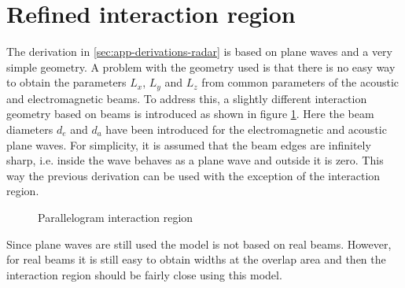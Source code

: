 \documentclass[11pt,twoside]{eitExjobb}
\begin{document}
	\section{Refined interaction region} \label{sec:app-derivations-refined}
	The derivation in \ref{sec:app-derivations-radar} is based on plane waves and a very simple geometry. A problem with the geometry used is that there is no easy way to obtain the parameters $L_x$, $L_y$ and $L_z$ from common parameters of the acoustic and electromagnetic beams. To address this, a slightly different interaction geometry based on beams is introduced as shown in figure \ref{fig:parallelogram}. Here the beam diameters $d_e$ and $d_a$ have been introduced for the electromagnetic and acoustic plane waves. For simplicity, it is assumed that the beam edges are infinitely sharp, i.e. inside the wave behaves as a plane wave and outside it is zero. This way the previous derivation can be used with the exception of the interaction region.
	\begin{figure}[h]
		\centering
		\resizebox{\textwidth}{!}{
			
		}
		\caption{\label{fig:parallelogram} Parallelogram interaction region}
	\end{figure}
	Since plane waves are still used the model is not based on real beams. However, for real beams it is still easy to obtain widths at the overlap area and then the interaction region should be fairly close using this model.
	
\end{document}
